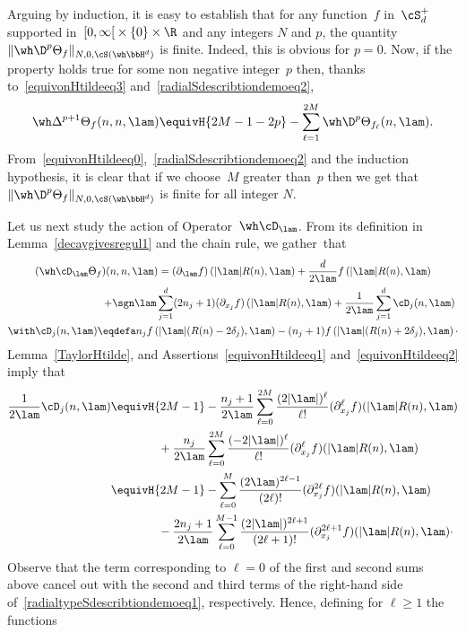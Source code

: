 Arguing by induction, it is easy to establish that for any function~$f$ in~$\cS_d^+$ supported in~$[0,\infty\mathclose{[}\times\{0\}\times \R$ and any integers $N$ and $p$, the quantity $\|\wh\D^p \Theta_f\|_{N,0,\cS(\wh\bbH^d)}$ is finite. Indeed, this is obvious for $p=0$. Now, if the property holds true for some non negative integer~$p$ then, thanks to~\eqref{equivonHtildeeq3} and~\eqref{radialSdescribtiondemoeq2},
\[
\wh \Delta^{p+1} \Theta_f (n,n,\lam) \equivH {2M-1-2p} -\sum_{\ell=1}^{2M} \wh \D^p \Theta_{f_\ell}(n,\lam).
\]
From~\eqref{equivonHtildeeq0},~\eqref{radialSdescribtiondemoeq2} and the induction hypothesis, it is clear that if we choose~$M$ greater than~$p$ then we get that $\|\wh\D^p \Theta_f\|_{N,0,\cS(\wh\bbH^d)}$ is finite for all integer $N$.

Let us next study the action of Operator~$\wh\cD_\lam$. From its definition in Lemma~\ref{decaygivesregul1} and the chain rule, we gather~that
\begin{multline}\label{radialtypeSdescribtiondemoeq1}
(\wh\cD_\lam \Theta_f)(n,n,\lam) = (\partial_\lam f)\left(|\lam|R(n),\lam\right)+ \frac d {2\lam} f \left(|\lam|R(n),\lam\right)
\\ \mkern 160mu+\sgn\lam \sum_{j=1} ^d (2n_j+1)(\partial_{x_j} f)\left(|\lam|R(n),\lam\right) +\frac 1{2 \lam}\sum_{j=1}^d \cD_j(n,\lam)\\ \with
\cD_j(n,\lam)\eqdefa n_j f \left(|\lam| (R(n)-2\delta_j),\lam\right) -(n_j+1) f \left(|\lam| (R(n)+2\delta_j),\lam\right)\cdotp
\end{multline}
Lemma~\ref{TaylorHtilde}, and Assertions~\eqref{equivonHtildeeq1} and~\eqref{equivonHtildeeq2} imply that
\begin{align}
\nonumber\frac 1 {2\lam} \cD _j(n,\lam) &\equivH {2M-1} -\frac {n_j+1} {2\lam} \sum_{\ell=0} ^{2M} \frac { (2|\lam|)^\ell } {\ell!} (\partial_{x_j}^\ell f)(|\lam|R(n),\lam)\\
\nonumber &\qquad\qquad {}+\frac {n_j} {2\lam} \sum_{\ell=0} ^{2M} \frac {(-2|\lam|)^\ell} {\ell!} (\partial^\ell_{x_j} f)(|\lam|R(n),\lam)\\\label{radialSdescribtiondemoeq3}
&\equivH {2M-1} - \sum_{\ell=0}^M \frac { (2\lam)^{2\ell-1 }} {(2\ell)!} (\partial_{x_j}^{2\ell} f)(|\lam|R(n),\lam)\\
\nonumber &\qquad\qquad {}-\frac {2n_j+1} {2\lam} \sum_{\ell=0} ^{M-1} \frac {(2|\lam|)^{2\ell+1}} {(2\ell+1)!} (\partial^{2\ell+1}_{x_j} f)(|\lam|R(n),\lam)\cdotp
\end{align}
Observe that the term corresponding to $\ell=0$ of the first and second sums above cancel out with the second and third terms of the right-hand side of~\eqref{radialtypeSdescribtiondemoeq1}, respectively. Hence, defining for $\ell\geq1$ the functions
